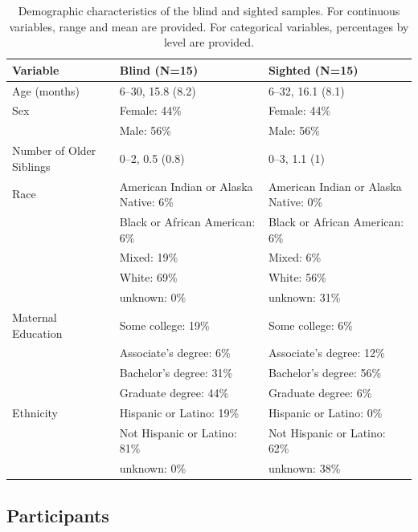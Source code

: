 \documentclass[
  man,floatsintext]{apa6}
\begin{document}
\begin{table}

\caption{\label{tab:participant-characteristics}Demographic characteristics of the blind and sighted samples. For continuous variables, range and mean are provided. For categorical variables, percentages by level are provided.}
\centering
\fontsize{8}{10}\selectfont
\begin{tabular}[t]{l|l|l}
\hline
Variable & Blind (N=15) & Sighted (N=15)\\
\hline
Age (months) & 6--30,
15.8 (8.2) & 6--32,
16.1 (8.1)\\
\hline
Sex & Female: 44\% & Female: 44\%\\
\hline
 & Male: 56\% & Male: 56\%\\
\hline
Number of Older Siblings & 0--2,
0.5 (0.8) & 0--3,
1.1 (1)\\
\hline
Race & American Indian or Alaska Native: 6\% & American Indian or Alaska Native: 0\%\\
\hline
 & Black or African American: 6\% & Black or African American: 6\%\\
\hline
 & Mixed: 19\% & Mixed: 6\%\\
\hline
 & White: 69\% & White: 56\%\\
\hline
 & unknown: 0\% & unknown: 31\%\\
\hline
Maternal Education & Some college: 19\% & Some college: 6\%\\
\hline
 & Associate's degree: 6\% & Associate's degree: 12\%\\
\hline
 & Bachelor's degree: 31\% & Bachelor's degree: 56\%\\
\hline
 & Graduate degree: 44\% & Graduate degree: 6\%\\
\hline
Ethnicity & Hispanic or Latino: 19\% & Hispanic or Latino: 0\%\\
\hline
 & Not Hispanic or Latino: 81\% & Not Hispanic or Latino: 62\%\\
\hline
 & unknown: 0\% & unknown: 38\%\\
\hline
\end{tabular}
\end{table}

\hypertarget{participants}{%
\subsection{Participants}\label{participants}}
\end{document}
